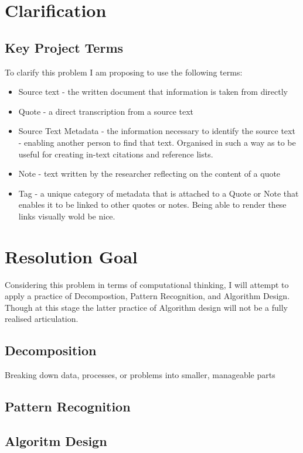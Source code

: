 \documentclass{article}
\begin{document}
\section{Clarification}
\subsection{Key Project Terms}

To clarify this problem I am proposing to use the following terms:
\begin{itemize}
    \item Source text - the written document that information is taken from directly
    \item Quote - a direct transcription from a source text
    \item Source Text Metadata - the information necessary to identify the source text - enabling another person to find that text. Organised in such a way as to be useful for creating in-text citations and reference lists.
    \item Note - text written by the researcher reflecting on the content of a quote
    \item Tag - a unique category of metadata that is attached to a Quote or Note that enables it to be linked to other quotes or notes. Being able to render these links visually wold be nice. 
\end{itemize}

\section{Resolution Goal}
Considering this problem in terms of computational thinking, I will attempt to apply a practice of Decompostion, Pattern Recognition, and Algorithm Design. Though at this stage the latter practice of Algorithm design will not be a fully realised articulation.

\subsection{Decomposition}
Breaking down data, processes, or problems into smaller, manageable parts




\subsection{Pattern Recognition}

\subsection{Algoritm Design}
\end{document}
